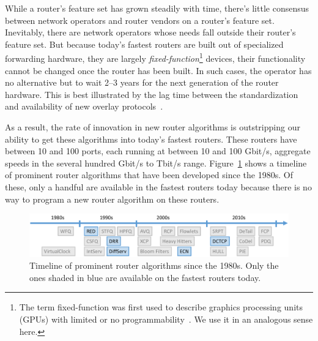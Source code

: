 While a router's feature set has grown steadily with time, there's little
consensus between network operators and router vendors on a router's feature
set. Inevitably, there are network operators whose needs fall outside their
router's feature set. But because today's fastest routers are built out of
specialized forwarding hardware, they are largely {\em
fixed-function}\footnote{The term fixed-function was first used to describe
graphics processing units (GPUs) with limited or no
programmability~\cite{gpu_fixed}. We use it in an analogous sense here.}
devices, \ie their functionality cannot be changed once the router has been
built. In such cases, the operator has no alternative but to wait 2--3 years
for the next generation of the router hardware. This is best illustrated by the
lag time between the standardization and availability of new overlay
protocols~\cite{nvgre}.

As a result, the rate of innovation in new router algorithms is outstripping
our ability to get these algorithms into today's fastest routers. These routers
have between 10 and 100 ports, each running at between 10 and 100 Gbit/s, \ie
aggregate speeds in the several hundred Gbit/s to Tbit/s range.
Figure~\ref{fig:router_algos} shows a timeline of prominent router algorithms
that have been developed since the 1980s. Of these, only a handful are
available in the fastest routers today because there is no way to program a new
router algorithm on these routers.

\begin{figure}
\centering
\includegraphics[width=\columnwidth]{router_alg_timeline.pdf}
\caption{Timeline of prominent router algorithms since the 1980s. Only the ones
shaded in blue are available on the fastest routers today.}
\label{fig:router_algos}
\end{figure}

